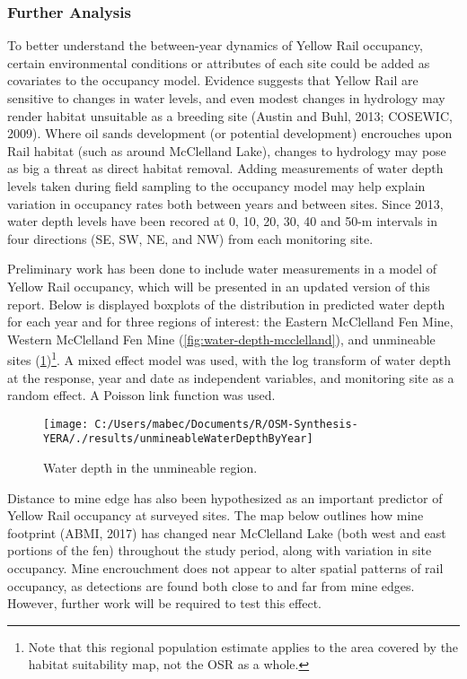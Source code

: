\documentclass[11pt,]{article}
\let\rmarkdownfootnote\footnote%
\def\footnote{\protect\rmarkdownfootnote}
\begin{document}
\subsubsection{Further Analysis}\label{further-analysis}

To better understand the between-year dynamics of Yellow Rail occupancy,
certain environmental conditions or attributes of each site could be
added as covariates to the occupancy model. Evidence suggests that
Yellow Rail are sensitive to changes in water levels, and even modest
changes in hydrology may render habitat unsuitable as a breeding site
(Austin and Buhl, 2013; COSEWIC, 2009). Where oil sands development (or
potential development) encrouches upon Rail habitat (such as around
McClelland Lake), changes to hydrology may pose as big a threat as
direct habitat removal. Adding measurements of water depth levels taken
during field sampling to the occupancy model may help explain variation
in occupancy rates both between years and between sites. Since 2013,
water depth levels have been recored at 0, 10, 20, 30, 40 and 50-m
intervals in four directions (SE, SW, NE, and NW) from each monitoring
site.

Preliminary work has been done to include water measurements in a model
of Yellow Rail occupancy, which will be presented in an updated version
of this report. Below is displayed boxplots of the distribution in
predicted water depth for each year and for three regions of interest:
the Eastern McClelland Fen Mine, Western McClelland Fen Mine
(\ref{fig:water-depth-mcclelland}), and unmineable sites
(\ref{fig:water-depth-unmineable})\footnote{Note that this regional
  population estimate applies to the area covered by the habitat
  suitability map, not the OSR as a whole.}. A mixed effect model was
used, with the log transform of water depth at the response, year and
date as independent variables, and monitoring site as a random effect. A
Poisson link function was used.

\begin{figure}[H]

{\centering \texttt{[image: C:/Users/mabec/Documents/R/OSM-Synthesis-YERA/./results/unmineableWaterDepthByYear]} 

}

\caption{Water depth in the unmineable region.}\label{fig:water-depth-unmineable}
\end{figure}

Distance to mine edge has also been hypothesized as an important
predictor of Yellow Rail occupancy at surveyed sites. The map below
outlines how mine footprint (ABMI, 2017) has changed near McClelland
Lake (both west and east portions of the fen) throughout the study
period, along with variation in site occupancy. Mine encrouchment does
not appear to alter spatial patterns of rail occupancy, as detections
are found both close to and far from mine edges. However, further work
will be required to test this effect.
\end{document}

